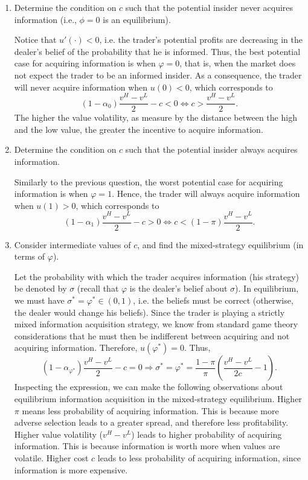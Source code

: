 \documentclass[11pt
]{exam}
\begin{document}
\begin{enumerate} [label=(\alph*). ]
\item Determine the condition on $c$ such that the potential insider never acquires information (i.e., $\phi=0$ is an equilibrium).

\begin{solution}
Notice that $u'(\cdot)<0$, i.e. the trader's potential profits are decreasing in the dealer's belief of the probability that he is informed. Thus, the best potential case for acquiring information is when $\varphi=0$, that is, when the market does not expect the trader to be an informed insider. As a consequence, the trader will never acquire information when $u(0) < 0$, which corresponds to
\[
(1-\alpha_0)\frac{v^H-v^L}{2}-c <0 \Leftrightarrow c > \frac{v^H-v^L}{2}.
\]
The higher the value volatility, as measure by the distance between the high and the low value, the greater the incentive to acquire information.
\end{solution}

\item Determine the condition on $c$ such that the potential insider always acquires information.

\begin{solution}
Similarly to the previous question, the worst potential case for acquiring information is when $\varphi=1$. Hence, the trader will always acquire information when $u(1) > 0$, which corresponds to
\[
(1-\alpha_1)\frac{v^H-v^L}{2}-c > 0 \Leftrightarrow c < (1-\pi) \frac{v^H-v^L}{2}.
\]

\end{solution}

\item Consider intermediate values of $c$, and find the mixed-strategy equilibrium (in terms of $\varphi$).

\begin{solution}
Let the probability with which the trader acquires information (his strategy) be denoted by $\sigma$ (recall that $\varphi$ is the dealer's belief about $\sigma$). In equilibrium, we must have $\sigma^*=\varphi^* \in (0,1)$, i.e. the beliefs must be correct (otherwise, the dealer would change his beliefs). Since the trader is playing a strictly mixed information acquisition strategy, we know from standard game theory considerations that he must then be indifferent between acquiring and not acquiring information. Therefore, $u(\varphi^*)=0$. Thus,
\[
(1-\alpha_{\varphi^*})\frac{v^H-v^L}{2}-c = 0 \Rightarrow \sigma^*=\varphi^* = \frac{1-\pi}{\pi} \left(\frac{v^H-v^L}{2c} -1 \right).
\]
Inspecting the expression, we can make the following observations about equilibrium information acquisition in the mixed-strategy equilibrium. Higher $\pi$ means less probability of acquiring information. This is because more adverse selection leads to a greater spread, and therefore less profitability. Higher value volatility ($v^H-v^L$) leads to higher probability of acquiring information. This is because information is worth more when values are volatile. Higher cost $c$ leads to less probability of acquiring information, since information is more expensive.


\end{solution}
\end{enumerate}
\end{document}
